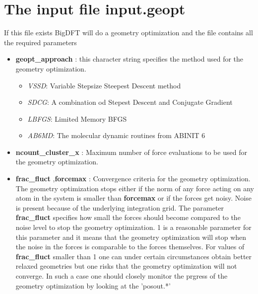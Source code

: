\documentclass[a4paper,11pt]{report}
\begin{document}
\section{The input file input.geopt}
If this file exists BigDFT will do a geometry optimization and the file contains all the required parameters

\begin{itemize}
\item {\bf geopt\_approach} : this character string specifies the method used for the geometry optimization.
       \begin{itemize}
       \item  \emph{VSSD}: Variable Stepsize Steepest Descent method
       \item  \emph{SDCG}: A combination od Stepest Descent and Conjugate Gradient
       \item  \emph{LBFGS}: Limited Memory BFGS
       \item  \emph{AB6MD}: The molecular dynamic routines from ABINIT 6
       \end{itemize}
\item  {\bf  ncount\_cluster\_x} : Maximum number of force evaluations to be used for the geometry optimization.
\item  {\bf frac\_fluct },{\bf forcemax } : Convergence criteria for the geometry optimization. The geometry optimization stops either 
                                           if the norm of any force acting on any atom in the system is smaller than {\bf forcemax } 
                                           or if the forces get noisy. Noise is present because of the underlying integration grid.
                                           The parameter {\bf frac\_fluct } specifies how small the forces should become 
                                           compared to the noise level to stop the geometry optimization. 1 is a reasonable parameter 
                                           for this parameter and it means that the geometry optimization will stop when the noise 
                                           in the forces is comparable to the forces themselves. For values of  {\bf frac\_fluct } 
                                           smaller than 1 one can under certain circumstances obtain better relaxed geometries but 
                                           one risks that the geometry optimization will not converge. In such a case one should 
                                           closely monitor the prgress of the geometry optimization by looking at the 'posout.*' 

\end{itemize}
\end{document}
